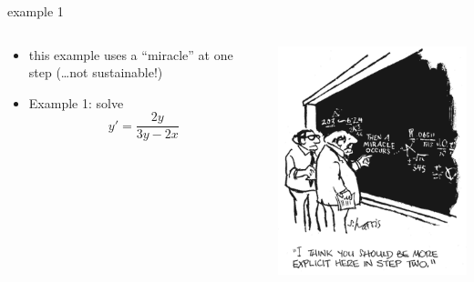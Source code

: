 \documentclass{beamer}
\begin{document}
\begin{frame}{example 1}

\begin{columns}
\begin{column}{0.65\textwidth}
\begin{itemize}
\item this example uses a ``miracle'' at one step (\dots not sustainable!)
\item Example 1: solve
    $$y' = \frac{2y}{3y-2x}$$

\vspace{40mm}
\end{itemize}
\end{column}
\begin{column}{0.35\textwidth}
\includegraphics[width=\textwidth]{figs/miracle.png}

\vspace{20mm}
\end{column}
\end{columns}
\end{frame}
\end{document}

